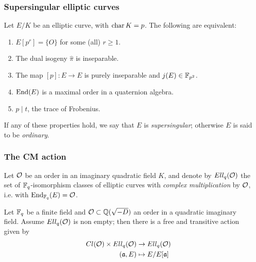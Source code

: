 \documentclass{beamer}
\begin{document}
    \begin{frame}
        \frametitle{Supersingular elliptic curves}
        
        \begin{theorem}
            Let $E/K$ be an elliptic curve, with $\operatorname{char} K=p$. The following are equivalent:
            \begin{enumerate}
                \item $E[p^r]=\{O\}$ for some (all) $r\ge1$.
                \item The dual isogeny $\hat\pi$ is inseparable.
                \item The map $[p]:E\to E$ is purely inseparable and $j(E)\in\mathbb{F}_{p^2}$.
                \item $\operatorname{End}(E)$ is a maximal order in a quaternion algebra.
                \item $p\mid t$, the trace of Frobenius.
            \end{enumerate}
            If any of these properties hold, we say that $E$ is \emph{supersingular}; otherwise $E$ is said to be \emph{ordinary}.
        \end{theorem}
    \end{frame}

    \begin{frame}
        \frametitle{The CM action}
        
        \begin{definition}
            Let $\mathcal{O}$ be an order in an imaginary quadratic field $K$, and denote by $Ell_q(\mathcal{O})$ the set of $\mathbb{F}_q$-isomorphism classes of elliptic curves with \emph{complex multiplication} by $\mathcal{O}$, i.e. with $\operatorname{End}_{\mathbb{F}_q}(E)=\mathcal{O}$.
        \end{definition}
        
        \begin{theorem}
            Let $\mathbb{F}_q$ be a finite field and $\mathcal{O}\subset\mathbb{Q}(\sqrt{-D})$ an order in a quadratic imaginary field. Assume $Ell_q(\mathcal{O})$ is non empty; then there is a free and transitive action given by
            \begin{align*}
            Cl(\mathcal{O})\times Ell_q(\mathcal{O}) & \to  Ell_q(\mathcal{O})\\
            (\mathfrak{a}, E) & \mapsto  E/E[\mathfrak{a}]
            \end{align*}
        \end{theorem}
    
    \end{frame}
\end{document}
